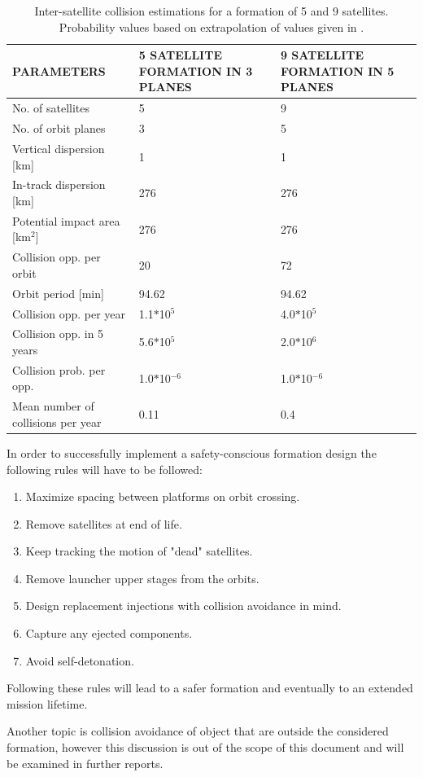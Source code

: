 \begin{table}
	\centering
	
		\begin{tabular}{p{5cm}|p{5cm}|p{5cm}}
	\textbf{PARAMETERS} & \textbf{5 SATELLITE FORMATION IN 3 PLANES} & \textbf{9 SATELLITE FORMATION IN 5 PLANES} \\
		\hline \hline
		No. of satellites & 5 & 9 \\
		No. of orbit planes & 3 & 5 \\ 
		Vertical dispersion [km] & 1 & 1 \\
		In-track dispersion [km] & 276 & 276 \\
		Potential impact area [km$^2$] & 276 & 276 \\ 
		Collision opp. per orbit & 20 & 72 \\
		Orbit period [min] & 94.62 & 94.62 \\ 
		Collision opp. per year & 1.1$*$10$^5$ & 4.0$*$10$^5$ \\
		Collision opp. in 5 years & 5.6$*$10$^5$ & 2.0$*$10$^6$ \\
		Collision prob. per opp. & 1.0$*$10$^{-6}$ & 1.0$*$10$^{-6}$ \\
		Mean number of collisions per year & 0.11 & 0.4
		
			\end{tabular}
	\caption{Inter-satellite collision estimations for a formation of 5 and 9 satellites. Probability values based on extrapolation of values given in \cite{constDesign}.}
	\label{table:coll}
\end{table}

In order to successfully implement a safety-conscious formation design the following rules will have to be followed:
 
\begin{enumerate}
	\item Maximize spacing between platforms on orbit crossing.
	\item Remove satellites at end of life.
	\item Keep tracking the motion of "dead" satellites.
	\item Remove launcher upper stages from the orbits.
	\item Design replacement injections with collision avoidance in mind.
	\item Capture any ejected components.
	\item Avoid self-detonation.
\end{enumerate}
 
Following these rules will lead to a safer formation and eventually to an extended mission lifetime.

Another topic is collision avoidance of object that are outside the considered formation, however this discussion is out of the scope of this document and will be examined in further reports.